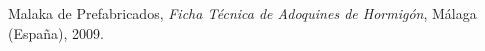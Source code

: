 % 
\begin{thebibliography}{100}




Malaka de Prefabricados, \emph{Ficha Técnica de Adoquines de Hormigón}, Málaga (España), 2009.









\end{thebibliography}
